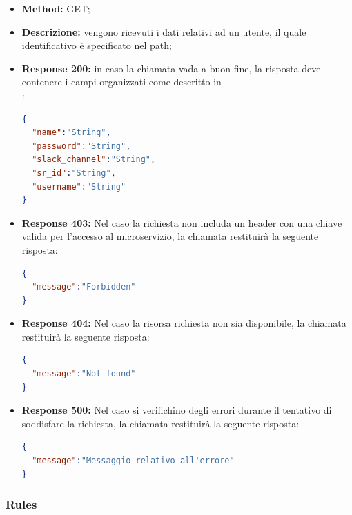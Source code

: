 \begin{itemize}
\begin{itemize}
\item \textbf{Method:} GET;
\item \textbf{Descrizione:} vengono ricevuti i dati relativi ad un utente, il quale identificativo è specificato nel path;
\item \textbf{Response 200:} in caso la chiamata vada a buon fine, la risposta deve contenere i campi organizzati come descritto in \\:
\begin{lstlisting}[language=json,firstnumber=1]
{
  "name":"String",
  "password":"String",
  "slack_channel":"String",
  "sr_id":"String",
  "username":"String"
}
\end{lstlisting}
\item \textbf{Response 403:} Nel caso la richiesta non includa un header  con una chiave valida per l'accesso al microservizio, la chiamata restituirà la seguente risposta:
\begin{lstlisting}[language=json,firstnumber=1]
{
  "message":"Forbidden"
}
\end{lstlisting}
\item \textbf{Response 404:} Nel caso la risorsa richiesta non sia disponibile, la chiamata restituirà la seguente risposta:
\begin{lstlisting}[language=json,firstnumber=1]
{
  "message":"Not found"
}
\end{lstlisting}
\item \textbf{Response 500:} Nel caso si verifichino degli errori durante il tentativo di soddisfare la richiesta, la chiamata restituirà la seguente risposta:
\begin{lstlisting}[language=json,firstnumber=1]
{
  "message":"Messaggio relativo all'errore"
}
\end{lstlisting}
\end{itemize}

\end{itemize}

\subsubsection{Rules}
